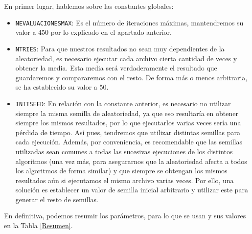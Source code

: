 En primer lugar, hablemos sobre las constantes globales:
\begin{itemize}
	\item \texttt{NEVALUACIONESMAX}: Es el número de iteraciones máximas, mantendremos su valor a 450 por lo explicado en el apartado anterior. 
	\item \texttt{NTRIES}: Para que nuestros resultados no sean muy dependientes de la aleatoriedad, es necesario ejecutar cada archivo cierta cantidad de veces y obtener la media. 
Esta media será verdaderamente el resultado que guardaremos y compararemos con el resto. 
De forma más o menos arbitraria, se ha establecido su valor a 50.
	\item \texttt{INITSEED}: En relación con la constante anterior, es necesario no utilizar siempre la misma semilla de aleatoriedad, ya que eso resultaría en obtener siempre los mismos resultados, por lo que ejecutarlos varias veces sería una pérdida de tiempo. 
Así pues, tendremos que utilizar distintas semillas para cada ejecución. 
Además, por conveniencia, es recomendable que las semillas utilizadas sean comunes a todas las sucesivas ejecuciones de los distintos algoritmos (una vez más, para asegurarnos que la aleatoriedad afecta a todos los algoritmos de forma similar) y que siempre se obtengan los mismos resultados aún si ejecutamos el mismo archivo varias veces. 
Por ello, una solución es establecer un valor de semilla inicial arbitrario y utilizar este para generar el resto de semillas.
\end{itemize}

En definitiva, podemos resumir los parámetros, para lo que se usan y sus valores en la Tabla \ref{Resumen}.

